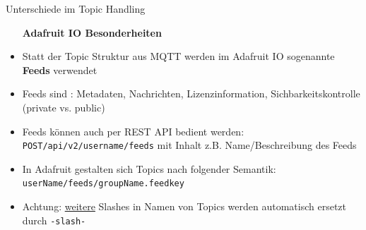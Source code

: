 \begin{frame}{Unterschiede im Topic Handling}
    \begin{itemize}
        \setlength{\itemindent}{1.6in}
        \item [\textbf{Adafruit IO Besonderheiten}]
    \end{itemize}
    \begin{itemize}
        \item Statt der Topic Struktur aus MQTT werden im Adafruit IO sogenannte  \textbf{Feeds} verwendet \cite{io.adafruit.com/api/docs}
        \item Feeds sind : Metadaten, Nachrichten, Lizenzinformation, Sichbarkeitskontrolle (private vs. public)
        \item Feeds können auch per REST API bedient werden:  \texttt{POST/api/v2/{username}/feeds} mit Inhalt z.B. Name/Beschreibung des Feeds
        \item In Adafruit gestalten sich Topics nach folgender Semantik: \texttt{userName/feeds/groupName.feedkey} \cite{Adafruit und MQTT Topics}
        \item Achtung: \underline{weitere} Slashes in Namen von Topics werden automatisch ersetzt durch \texttt{-slash-}
    \end{itemize}
\end{frame}

